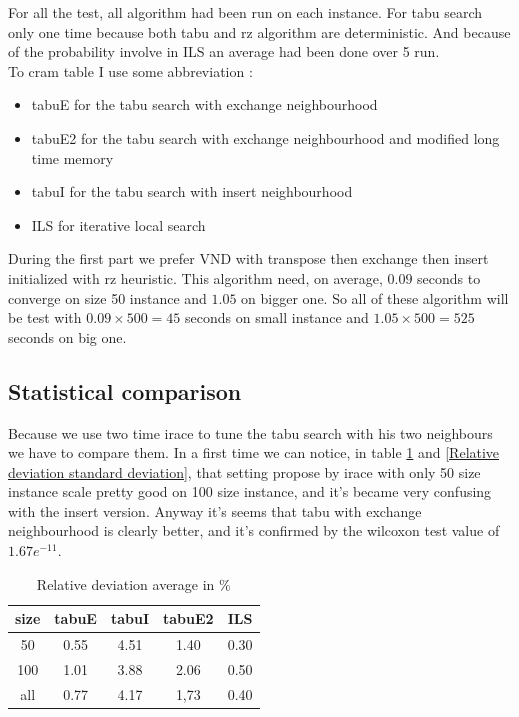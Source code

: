 \documentclass[12pt,a4paper]{article}
\begin{document}
For all the test, all algorithm had been run on each instance. For tabu search only one time because both tabu and rz algorithm are deterministic. And because of the probability involve in ILS an average had been done over 5 run.\\
To cram table I use some abbreviation :
\begin{itemize}
\item
tabuE for the tabu search with exchange neighbourhood
\item
tabuE2 for the tabu search with exchange neighbourhood and modified long time memory
\item
tabuI for the tabu search with insert neighbourhood
\item
ILS for iterative local search
\end{itemize}
During the first part we prefer VND with transpose then exchange then insert initialized with rz heuristic. This algorithm need, on average, $0.09$ seconds to converge on size 50 instance and $1.05$ on bigger one. So all of these algorithm will be test with $0.09 \times 500 = 45$ seconds on small instance and $1.05 \times 500 = 525$ seconds on big one.

\subsection{Statistical comparison}

Because we use two time irace to tune the tabu search with his two neighbours we have to compare them. In a first time we can notice, in table \ref{Relative deviation average} and \ref{Relative deviation standard deviation}, that setting propose by irace with only 50 size instance scale pretty good on 100 size instance, and it's became very confusing with the insert version. Anyway it's seems that tabu with exchange neighbourhood is clearly better, and it's confirmed by the wilcoxon test value of $1.67 e^{-11}$.

\begin{table}[!h]
\centering
\begin{tabular}{|*{5}{c|}}
  \hline
  size & tabuE & tabuI & tabuE2 & ILS\\
  \hline
  50 & 0.55 & 4.51 & 1.40 & 0.30 \\ 
  100 & 1.01 & 3.88 & 2.06 & 0.50 \\
  all & 0.77 & 4.17 & 1,73 & 0.40 \\
  \hline
\end{tabular}
\caption{Relative deviation average in \%}
\label{Relative deviation average}
\end{table}
\end{document}
